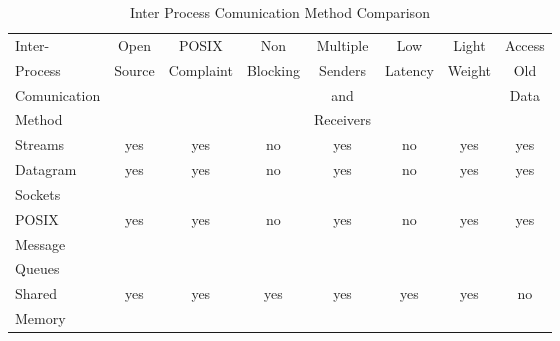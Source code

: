 
\begin{table}
\caption{Inter Process Comunication Method Comparison}
\small
\begin{tabular}{l || c | c | c | c | c | c | c}
\hline
Inter-                          & Open        & POSIX           & Non          & Multiple    & Low         & Light   & Access \\
Process                         &      Source &       Complaint &     Blocking & Senders     &     Latency & Weight  & Old   \\
Comunication                    &             &                 &              & and         &             &         & Data          \\
Method                          &             &                 &              & Receivers   &             &         &           \\
\hline
\hline
Streams                         & yes         & yes             & no           & yes       & no          & yes     & yes \\
\hline
Datagram                        & yes         & yes             & no           & yes       & no          & yes     & yes \\
Sockets                         &             &                 &              &           &             &         &     \\
\hline

POSIX                           & yes         & yes             & no           & yes       & no          & yes     & yes\\
Message                         &             &                 &              &           &             &         &     \\
Queues                          &             &                 &              &           &             &         &     \\
\hline
Shared                          & yes         & yes             & yes          & yes       & yes         & yes     & no \\
Memory                          &             &                 &              &           &             &         &     \\


\end{tabular}
\end{table}
